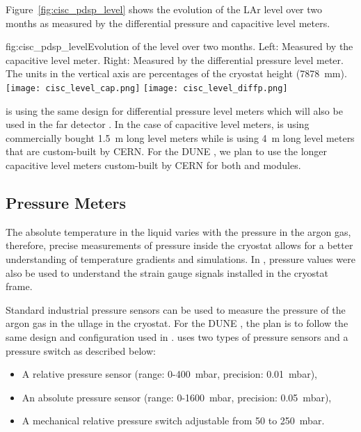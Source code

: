 Figure~\ref{fig:cisc_pdsp_level} shows the evolution of the  LAr level over two months as measured by the differential pressure and capacitive level meters. 

\begin{dunefigure}{fig:cisc_pdsp_level}{Evolution of the   level over two months. Left: Measured by the capacitive level meter. Right: Measured by the differential pressure level meter. The units in the vertical axis are percentages of the cryostat height (\SI{7878}{mm}).}
  \texttt{[image: cisc\_level\_cap.png]}%
  \hspace*{1cm}
  \texttt{[image: cisc\_level\_diffp.png]}%
\end{dunefigure}

 is using the same design for differential pressure level meters which will also be used in the far detector . In the case of capacitive level meters,  is using commercially bought 1.5~m long level meters while  is using 4~m long level meters that are custom-built by CERN. For the DUNE , we plan to use the longer capacitive level meters custom-built by CERN for both  and  modules.

\subsection{Pressure Meters}
\label{sec:fdgen-slow-cryo-press-meter}

The absolute temperature in the liquid varies with the pressure in the argon gas, therefore, precise measurements of pressure inside the cryostat allows for a better understanding of temperature gradients and  simulations. In , pressure values were also be used to understand the strain gauge signals installed in the cryostat frame.

Standard industrial pressure sensors can be used to measure the pressure of the argon gas in the ullage in the cryostat. For the DUNE , the plan is to follow the same design and configuration used in .  uses two types of pressure sensors and a pressure switch as described below:
\begin{itemize}
    \item A relative pressure sensor (range: 0-400~mbar, precision: 0.01~mbar),
    \item An absolute pressure sensor (range: 0-1600~mbar, precision: 0.05~mbar),
    \item A mechanical relative pressure switch adjustable from 50 to 250~mbar. 
\end{itemize}

